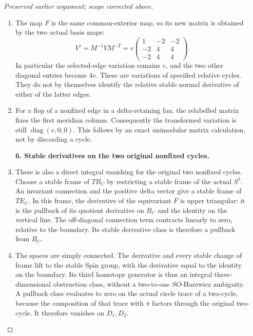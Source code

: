\begin{proof}[Preserved earlier argument; scope corrected above]
\begin{enumerate}[label=\arabic*.]
\par\medskip\noindent\textbf{5. The matrix after the fixed-edge flop.}\enspace

\item The map \(F\) is the same common-exterior map, so its new
matrix is obtained by the two actual basis maps:
\[
 V'=M^{-1}VM^{-T}
   =v\begin{pmatrix}
       1&-2&-2\\
       -2&4&4\\
       -2&4&4
      \end{pmatrix}.                                   \tag{P3K.29.16}
\]
In particular the selected-edge variation remains \(v\),
and the two other diagonal entries become \(4v\).
These are variations of specified relative cycles.
They do not by themselves identify the relative stable
normal derivative of either of the latter edges.

\item For a flop of a nonfixed edge in a delta-retaining fan,
the relabelled matrix fixes the first meridian column.
Consequently the transformed variation is still
\(\operatorname{diag}(v,0,0)\). This follows by an exact
unimodular matrix calculation, not by discarding a cycle.

\par\medskip\noindent\textbf{6. Stable derivatives on the two original nonfixed cycles.}\enspace

\item There is also a direct integral vanishing for the original
two nonfixed cycles. Choose a stable frame of \(TB_C\)
by restricting a stable frame of the actual \(S^5\).
An invariant connection and the positive delta vector
give a stable frame of \(TE_C\). In this frame, the
derivative of the equivariant \(F\) is upper triangular:
it is the pullback of its quotient derivative on \(B_C\)
and the identity on the vertical line. The off-diagonal
connection term contracts linearly to zero, relative
to the boundary. Its stable derivative class is therefore
a pullback from \(B_C\).

\item The spaces are simply connected. The derivative and every
stable change of frame lift to the stable Spin group,
with the derivative equal to the identity on the boundary.
Its third homotopy generator is thus an integral
three-dimensional obstruction class, without a
two-to-one \(SO\)-Hurewicz ambiguity. A pullback class
evaluates to zero on the actual circle trace of a
two-cycle, because the composition of that trace with
\(\pi\) factors through the original two-cycle.
It therefore vanishes on \(D_1,D_2\).


\end{enumerate}
\end{proof}
